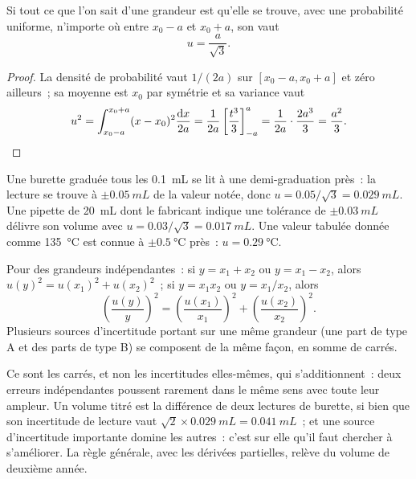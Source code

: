 \begin{proposition}\label{prop:b1:lab-techniques-1:type-b}
Si tout ce que l'on sait d'une grandeur est qu'elle se trouve, avec une
probabilité uniforme, n'importe où entre $x_0 - a$ et $x_0 + a$, son
 vaut
\[
  u = \frac{a}{\sqrt3}.
\]
\end{proposition}
\begin{proof}
La densité de probabilité vaut $1/(2a)$ sur $[x_0 - a, x_0 + a]$ et zéro
ailleurs~; sa moyenne est $x_0$ par symétrie et sa variance vaut
\[
  u^2 = \int_{x_0-a}^{x_0+a} (x - x_0)^2 \frac{\mathrm{d}x}{2a}
      = \frac{1}{2a} \left[\frac{t^3}{3}\right]_{-a}^{a}
      = \frac{1}{2a}\cdot\frac{2a^3}{3} = \frac{a^2}{3}. \qedhere
\]
\end{proof}

\begin{example}
Une burette graduée tous les \qty{0.1}{mL} se lit à une demi-graduation
près~: la lecture se trouve à $\pm\qty{0.05}{mL}$ de la valeur notée,
donc
$u = 0.05/\sqrt3 = \qty{0.029}{mL}$. Une pipette de \qty{20}{mL} dont le
fabricant indique une tolérance de $\pm\qty{0.03}{mL}$ délivre son
volume avec
$u = 0.03/\sqrt3 = \qty{0.017}{mL}$. Une valeur tabulée donnée comme
\qty{135}{\celsius} est connue à $\pm\qty{0.5}{\celsius}$ près~: $u = \qty{0.29}{\celsius}$.
\end{example}

\begin{proposition}\label{prop:b1:lab-techniques-1:combine}
Pour des grandeurs indépendantes~: si $y = x_1 + x_2$ ou $y = x_1 - x_2$, alors
$u(y)^2 = u(x_1)^2 + u(x_2)^2$~; si $y = x_1 x_2$ ou $y = x_1/x_2$, alors
\[
  \left(\frac{u(y)}{y}\right)^2 = \left(\frac{u(x_1)}{x_1}\right)^2
  + \left(\frac{u(x_2)}{x_2}\right)^2 .
\]
Plusieurs sources d'incertitude portant sur une même grandeur (une part
de type A et des parts de type B) se composent de la même façon, en
somme de carrés.
\end{proposition}
\admitted

Ce sont les carrés, et non les incertitudes elles-mêmes, qui
s'additionnent~: deux erreurs indépendantes poussent rarement dans le
même sens avec toute leur ampleur. Un volume titré est la différence de
deux lectures de burette, si bien que son incertitude de lecture vaut
$\sqrt2 \times \qty{0.029}{mL} = \qty{0.041}{mL}$~; et une source
d'incertitude importante domine les autres~: c'est sur elle qu'il faut
chercher à s'améliorer. La règle générale, avec les dérivées partielles,
relève du volume de deuxième année.

